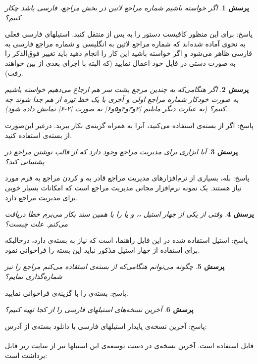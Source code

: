 \documentclass{article}
\theoremstyle{plain}\newtheorem{question}{پرسش}
\newcommand{\answer}{{\noindent \Sayeh پاسخ: }}
\newcommand\SLASH{\char`\\}
\begin{document}
\begin{question} اگر خواسته باشیم شماره مراجع لاتین در بخش مراجع، فارسی باشد چکار کنیم؟ \end{question}
\answer برای این منظور کافیست دستور \lr{\SLASH resetlatinfont} را به پس از \lr{\SLASH bibitem} منتقل کنید.
 استیلهای فارسی فعلی به نحوی آماده شده‌اند که شماره مراجع لاتین به انگلیسی و شماره مراجع فارسی به فارسی ظاهر می‌شود و اگر خواسته باشید این کار را انجام دهید باید تغییر فوق‌الذکر را به صورت دستی در فایل  خود اعمال نمایید (که البته با اجرای  بعدی از بین خواهند رفت).
\begin{question} اگر هنگامی‌که به چندین مرجع پشت سر هم ارجاع می‌دهیم خواسته باشیم  به صورت خودکار شماره مراجع اولی و آخری با یک خط تیره از هم جدا شوند چه کنیم؟ 
(به عبارت دیگر مایلیم [۲و۳و۴و۵و۶] به صورت [۲-۶] نمایش داده شود).
 \end{question}
\answer اگر از بسته‌ی  استفاده می‌کنید، آنرا به همراه گزینه‌ی  بکار ببرید. درغیر این‌صورت از بسته‌ی  استفاده کنید.

\begin{question} آیا ابزاری برای مدیریت مراجع وجود دارد که از قالب نوشتن مراجع در  پشتیبانی کند؟ \end{question}
\answer بله، بسیاری از نرم‌افزارهای مدیریت مراجع قادر به  و  کردن مراجع به فرم مورد نیاز  هستند. یک نمونه نرم‌افزار مجانی مدیریت مراجع  است که امکانات بسیار خوبی برای مدیریت مراجع دارد.

\begin{question} وقتی از یکی از چهار استیل ،،  و یا  را با همین سند بکار می‌برم خطا دریافت می‌کنم. علت چیست؟
 \end{question}
\answer استیل استفاده شده در این فایل راهنما،  است که نیاز به بسته‌ی  دارد، درحالیکه برای استفاده از چهار استیل مذکور نباید این بسته را فراخوانی نمود.

\begin{question} چگونه می‌توانم هنگامی‌که از بسته‌ی  استفاده می‌کنم مراجع را نیز شماره‌گذاری نمایم؟
 \end{question}
\answer بسته‌ی  را با گزینه‌ی  فراخوانی نمایید.

\begin{question} آخرین نسخه‌های استیلهای فارسی را از کجا تهیه کنیم؟
 \end{question}
\answer آخرین نسخه‌ی پایدار استیلهای فارسی با دانلود بسته‌ی  از آدرس:\\
\\
  قابل استفاده است. آخرین نسخه‌ی در دست توسعه‌ی این استیلها نیز از سایت زیر قابل برداشت است:\\ 
  
\end{document}
